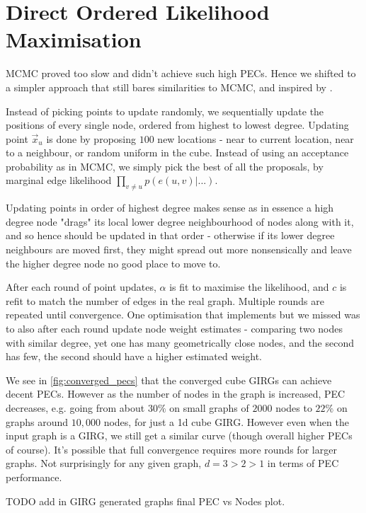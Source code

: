 \section{Direct Ordered Likelihood Maximisation}
MCMC proved too slow and didn't achieve such high PECs. Hence we shifted to a simpler approach that still bares similarities to MCMC, and inspired by \cite{garcia2019mercator}.

Instead of picking points to update randomly, we sequentially update the positions of every single node, ordered from highest to lowest degree. Updating point $\vec{x}_u$ is done by proposing $100$ new locations - near to current location, near to a neighbour, or random uniform in the cube. Instead of using an acceptance probability as in MCMC, we simply pick the best of all the proposals, by marginal edge likelihood $\prod_{v \neq u} p(e(u,v) | ...)$.

Updating points in order of highest degree makes sense as in essence a high degree node "drags" its local lower degree neighbourhood of nodes along with it, and so hence should be updated in that order - otherwise if its lower degree neighbours are moved first, they might spread out more nonsensically and leave the higher degree node no good place to move to.

After each round of point updates, $\alpha$ is fit to maximise the likelihood, and $c$ is refit to match the number of edges in the real graph. Multiple rounds are repeated until convergence. One optimisation that \cite{garcia2019mercator} implements but we missed was to also after each round update node weight estimates - comparing two nodes with similar degree, yet one has many geometrically close nodes, and the second has few, the second should have a higher estimated weight. 

We see in \cref{fig:converged_pecs} that the converged cube GIRGs can achieve decent PECs. However as the number of nodes in the graph is increased, PEC decreases, e.g. going from about $30\%$ on small graphs of $2000$ nodes to $22\%$ on graphs around $10,000$ nodes, for just a 1d cube GIRG. However even when the input graph is a GIRG, we still get a similar curve (though overall higher PECs of course). It's possible that full convergence requires more rounds for larger graphs.
Not surprisingly for any given graph, $d=3 > 2 > 1$ in terms of PEC performance. 

TODO add in GIRG generated graphs final PEC vs Nodes plot.



